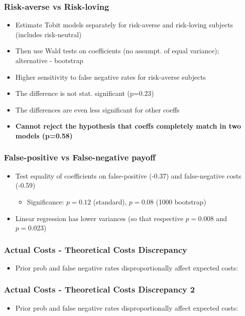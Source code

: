 \documentclass[11pt,hyperref={bookmarks=false}]{beamer}
\begin{document}
\begin{frame}
\frametitle{Risk-averse vs Risk-loving}
\begin{itemize}
\item Estimate Tobit models separately for risk-averse and risk-loving subjects (includes risk-neutral) 
\item Then use Wald tests on coefficients (no assumpt. of equal variance); alternative - bootstrap
\item Higher sensitivity to false negative rates for risk-averse subjects
\item The difference is not stat. significant (p=0.23)
\item The differences are even less significant for other coeffs
\item \textbf{Cannot reject the hypothesis that coeffs completely match in two models (p=0.58)}
\end{itemize}
\end{frame}


\begin{frame}
\frametitle{False-positive vs False-negative payoff}
\begin{itemize}
\item Test equality of coefficients on false-positive (-0.37) and false-negative costs (-0.59)
\begin{itemize}
\item Significance: $p=0.12$ (standard), $p=0.08$ (1000 bootstrap)
\end{itemize}
\item Linear regression has lower variances (so that respective $p=0.008$ and $p=0.023$)
\end{itemize}
\end{frame}
\fi



\begin{frame}
\frametitle{Actual Costs - Theoretical Costs Discrepancy}
\begin{itemize}
\item Prior prob and false negative rates disproportionally affect expected costs:
\end{itemize}
\footnotesize

\end{frame}


\begin{frame}
\frametitle{Actual Costs - Theoretical Costs Discrepancy 2}
\begin{itemize}
\item Prior prob and false negative rates disproportionally affect expected costs:
\end{itemize}
\footnotesize

\end{frame}
\end{document}
